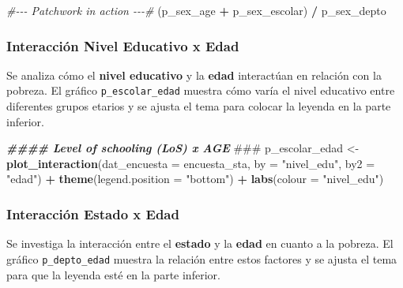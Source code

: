 \documentclass[
  12pt,
]{book}
\newenvironment{Shaded}{\begin{snugshade}}{\end{snugshade}}
\newcommand{\AlertTok}[1]{\textcolor[rgb]{0.94,0.16,0.16}{#1}}
\newcommand{\AttributeTok}[1]{\textcolor[rgb]{0.13,0.29,0.53}{#1}}
\newcommand{\CommentTok}[1]{\textcolor[rgb]{0.56,0.35,0.01}{\textit{#1}}}
\newcommand{\DocumentationTok}[1]{\textcolor[rgb]{0.56,0.35,0.01}{\textbf{\textit{#1}}}}
\newcommand{\FunctionTok}[1]{\textcolor[rgb]{0.13,0.29,0.53}{\textbf{#1}}}
\newcommand{\NormalTok}[1]{#1}
\newcommand{\OtherTok}[1]{\textcolor[rgb]{0.56,0.35,0.01}{#1}}
\newcommand{\SpecialCharTok}[1]{\textcolor[rgb]{0.81,0.36,0.00}{\textbf{#1}}}
\newcommand{\StringTok}[1]{\textcolor[rgb]{0.31,0.60,0.02}{#1}}
\begin{document}
\begin{Shaded}
\begin{Highlighting}[]
\CommentTok{\#{-}{-}{-} Patchwork in action {-}{-}{-}\#}
\NormalTok{(p\_sex\_age }\SpecialCharTok{+}\NormalTok{ p\_sex\_escolar) }\SpecialCharTok{/}\NormalTok{ p\_sex\_depto}
\end{Highlighting}
\end{Shaded}

\hypertarget{interacciuxf3n-nivel-educativo-x-edad}{%
\subsubsection*{Interacción Nivel Educativo x Edad}\label{interacciuxf3n-nivel-educativo-x-edad}}

Se analiza cómo el \textbf{nivel educativo} y la \textbf{edad} interactúan en relación con la pobreza. El gráfico \texttt{p\_escolar\_edad} muestra cómo varía el nivel educativo entre diferentes grupos etarios y se ajusta el tema para colocar la leyenda en la parte inferior.

\begin{Shaded}
\begin{Highlighting}[]
\DocumentationTok{\#\#\#\# Level of schooling (LoS) x AGE }\AlertTok{\#\#\#}
\NormalTok{p\_escolar\_edad }\OtherTok{\textless{}{-}}
  \FunctionTok{plot\_interaction}\NormalTok{(}\AttributeTok{dat\_encuesta =}\NormalTok{ encuesta\_sta,}
                   \AttributeTok{by =} \StringTok{"nivel\_edu"}\NormalTok{,}
                   \AttributeTok{by2 =} \StringTok{"edad"}\NormalTok{) }\SpecialCharTok{+}
  \FunctionTok{theme}\NormalTok{(}\AttributeTok{legend.position =} \StringTok{"bottom"}\NormalTok{) }\SpecialCharTok{+} \FunctionTok{labs}\NormalTok{(}\AttributeTok{colour =} \StringTok{"nivel\_edu"}\NormalTok{)}
\end{Highlighting}
\end{Shaded}

\hypertarget{interacciuxf3n-estado-x-edad}{%
\subsubsection*{Interacción Estado x Edad}\label{interacciuxf3n-estado-x-edad}}

Se investiga la interacción entre el \textbf{estado} y la \textbf{edad} en cuanto a la pobreza. El gráfico \texttt{p\_depto\_edad} muestra la relación entre estos factores y se ajusta el tema para que la leyenda esté en la parte inferior.
\end{document}
